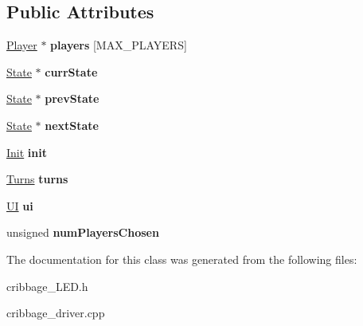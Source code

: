 \subsection*{Public Attributes}
\begin{DoxyCompactItemize}
\item 
\mbox{\label{class_cribbage_1_1_controller_a1a28955787f0041fc84ea1d988df3c27}} 
\hyperlink{class_cribbage_1_1_player}{Player} $\ast$ {\bfseries players} \mbox{[}M\+A\+X\+\_\+\+P\+L\+A\+Y\+E\+RS\mbox{]}
\item 
\mbox{\label{class_cribbage_1_1_controller_ae1a49d20e8f9bdf06edc76d99761e1cd}} 
\hyperlink{class_cribbage_1_1_state}{State} $\ast$ {\bfseries curr\+State}
\item 
\mbox{\label{class_cribbage_1_1_controller_af159cf12e2512b0eb7c1dfbb7b479276}} 
\hyperlink{class_cribbage_1_1_state}{State} $\ast$ {\bfseries prev\+State}
\item 
\mbox{\label{class_cribbage_1_1_controller_a77f33d4bf91f7a7c99a33414002e4c90}} 
\hyperlink{class_cribbage_1_1_state}{State} $\ast$ {\bfseries next\+State}
\item 
\mbox{\label{class_cribbage_1_1_controller_a1e158b87fd4db6584b14d3c34c91273c}} 
\hyperlink{class_cribbage_1_1_init}{Init} {\bfseries init}
\item 
\mbox{\label{class_cribbage_1_1_controller_a84db72dcd227d43bf11548d94a8f7d63}} 
\hyperlink{class_cribbage_1_1_turns}{Turns} {\bfseries turns}
\item 
\mbox{\label{class_cribbage_1_1_controller_ad08b68f1fb5270aaddfddda732f0225f}} 
\hyperlink{class_cribbage_1_1_u_i}{UI} {\bfseries ui}
\item 
\mbox{\label{class_cribbage_1_1_controller_a88c5fe2c3a3272a5e8986a50d7b18d22}} 
unsigned {\bfseries num\+Players\+Chosen}
\end{DoxyCompactItemize}


The documentation for this class was generated from the following files\+:\begin{DoxyCompactItemize}
\item 
cribbage\+\_\+\+L\+E\+D.\+h\item 
cribbage\+\_\+driver.\+cpp\end{DoxyCompactItemize}
